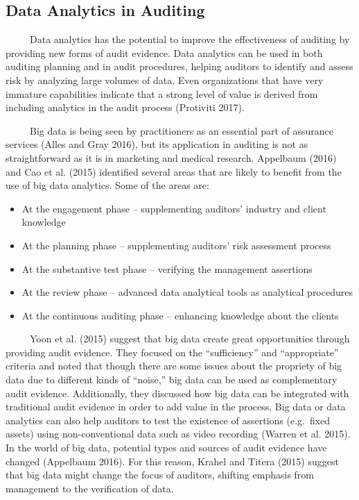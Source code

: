 \documentclass[
  letterpaper,
  DIV=11,
  numbers=noendperiod]{scrreprt}
\begin{document}
\subsection{Data Analytics in
Auditing}\label{data-analytics-in-auditing}

~~~~~Data analytics has the potential to improve the effectiveness of
auditing by providing new forms of audit evidence. Data analytics can be
used in both auditing planning and in audit procedures, helping auditors
to identify and assess risk by analyzing large volumes of data. Even
organizations that have very immature capabilities indicate that a
strong level of value is derived from including analytics in the audit
process (Protiviti 2017).

~~~~~Big data is being seen by practitioners as an essential part of
assurance services (Alles and Gray 2016), but its application in
auditing is not as straightforward as it is in marketing and medical
research. Appelbaum (2016) and Cao et al. (2015) identified several
areas that are likely to benefit from the use of big data analytics.
Some of the areas are:

\begin{itemize}
\item
  At the engagement phase -- supplementing auditors' industry and client
  knowledge
\item
  At the planning phase -- supplementing auditors' risk assessment
  process
\item
  At the substantive test phase -- verifying the management assertions
\item
  At the review phase -- advanced data analytical tools as analytical
  procedures
\item
  At the continuous auditing phase -- enhancing knowledge about the
  clients
\end{itemize}

~~~~~Yoon et al. (2015) suggest that big data create great opportunities
through providing audit evidence. They focused on the ``sufficiency''
and ``appropriate'' criteria and noted that though there are some issues
about the propriety of big data due to different kinds of ``noise,'' big
data can be used as complementary audit evidence. Additionally, they
discussed how big data can be integrated with traditional audit evidence
in order to add value in the process. Big data or data analytics can
also help auditors to test the existence of assertions (e.g.~fixed
assets) using non-conventional data such as video recording (Warren et
al. 2015). In the world of big data, potential types and sources of
audit evidence have changed (Appelbaum 2016). For this reason, Krahel
and Titera (2015) suggest that big data might change the focus of
auditors, shifting emphasis from management to the verification of data.
\end{document}
